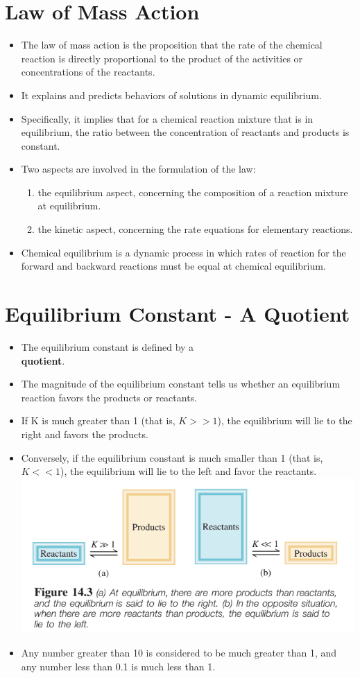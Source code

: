 \documentclass[a4paper,12pt,twocolumn]{article}
\begin{document}
\section{Law of Mass Action}
\begin{itemize}
    \item The law of mass action is the proposition that the rate of the chemical reaction is directly proportional to the product of the activities or concentrations of the reactants. 
    \item It explains and predicts behaviors of solutions in dynamic equilibrium. 
    \item Specifically, it implies that for a chemical reaction mixture that is in equilibrium, the ratio between the concentration of reactants and products is constant.
    \item Two aspects are involved in the formulation of the law:
          \begin{enumerate}
            \item the equilibrium aspect, concerning the composition of a reaction mixture at equilibrium.
            \item the kinetic aspect, concerning the rate equations for elementary reactions.
          \end{enumerate}
    \item Chemical equilibrium is a dynamic process in which rates of reaction for the forward and backward reactions must be equal at chemical equilibrium.
\end{itemize}

\section{Equilibrium Constant - A Quotient}
\begin{itemize}
    \item The equilibrium constant is defined by a \\ \textbf{quotient}.
    \item The magnitude of the equilibrium constant tells us whether an equilibrium reaction favors the products or reactants. 
    \item If K is much greater than 1 (that is, $K >>1$), the equilibrium will lie to the right and favors the products. 
    \item Conversely, if the equilibrium constant is much smaller than 1 (that is, $K << 1$), the equilibrium will lie to the left and favor the reactants.\\
          \includegraphics[width=.5\textwidth]{Screenshot 2023-03-23 005954.png}
    \item Any number greater than 10 is considered to be much greater than 1, and any number less than 0.1 is much less than 1.
\end{itemize}
\end{document}
